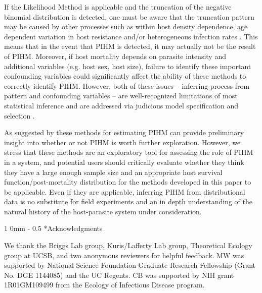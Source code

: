 \documentclass[12pt, a4paper]{article}
\makeatletter
\renewcommand{\section}{\@startsection
{section}%
{1}%
{0mm}%
{-\baselineskip}%
{0.5\baselineskip}%
{\normalfont\bf\large}} %
\makeatother
\begin{document}
If the Likelihood Method is applicable and the truncation of the negative binomial distribution is detected, one must be aware that the truncation pattern may be caused by other
processes such as within host density dependence, age dependent variation in host
resistance and/or heterogeneous infection rates \citep{Anderson1982a,Rousset1996, McCallum2000a}. This means that in the event
that PIHM is detected, it may actually not be the result of PIHM.  Moreover, if host mortality depends on parasite intensity and additional variables (e.g. host sex, host size), failure to identify these important confounding variables could significantly affect the ability of these methods to correctly identify PIHM. However, both of these issues -- inferring process from pattern and confounding variables -- are well-recognized limitations of most statistical inference and are addressed via judicious model specification and selection \citep{Seber2003}.

As suggested by \cite{Lester1984} these methods for estimating PIHM can
provide preliminary insight into whether or not PIHM is worth further
exploration.  However, we stress that these methods are an
exploratory tool for assessing the role of PIHM in a system, and potential
users should critically evaluate whether they think they have a large enough
sample size and an appropriate host survival function/post-mortality distribution for the methods developed
in this paper to be applicable.  Even if they are applicable, inferring PIHM
from distributional data is no substitute for field experiments
and an in depth understanding of the natural history of the host-parasite
system under consideration.

\section*{Acknowledgments}

We thank the Briggs Lab group, Kuris/Lafferty Lab group, Theoretical Ecology group at UCSB, and two anonymous reviewers for helpful feedback.  MW was supported by National Science Foundation Graduate Research Fellowship (Grant No. DGE 1144085) and the UC Regents. CB was supported by NIH grant 1R01GM109499 from the Ecology of Infectious Disease program.



\singlespacing


\end{document}
